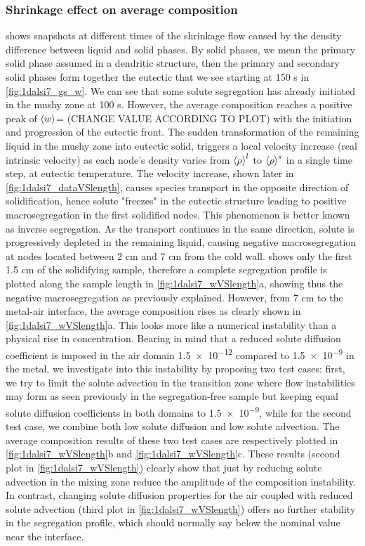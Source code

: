 \subsubsection{Shrinkage effect on average composition}
 shows snapshots at different times of the shrinkage flow caused by the density difference between liquid and solid phases.
By solid phases, we mean the primary solid phase assumed in a dendritic structure, then the primary and secondary solid phases form together the eutectic
that we see starting at 150 s in \cref{fig:1dalsi7_gs_w}. We can see that some solute segregation has already initiated in the mushy zone at 100 s.
However, the average composition reaches a positive peak of $\left \langle w \right \rangle$= (CHANGE VALUE ACCORDING TO PLOT) with the initiation and progression of the eutectic front.
The sudden transformation of the remaining liquid in the mushy zone into eutectic solid, triggers a local velocity increase (real intrinsic velocity)
as each node's density varies from $\left \langle \rho \right \rangle^l$ to $\left \langle \rho \right \rangle^s$ in a single time step, at eutectic temperature. The velocity increase, shown later in \cref{fig:1dalsi7_dataVSlength},
causes species transport in the opposite direction of solidification, hence solute "freezes" in the eutectic structure leading to positive macrosegregation
in the first solidified nodes. This phenomenon is better known as inverse segregation. 
As the transport continues in the same direction, 
solute is progressively depleted in the remaining liquid, causing negative macrosegregation at nodes located between 2 cm and 7 cm from the cold wall.
 shows only the first 1.5 cm of the solidifying sample, therefore a complete segregation profile is plotted along the sample length in \cref{fig:1dalsi7_wVSlength}a,
showing thus the negative macrosegregation as previously explained.
However, from 7 cm to the metal-air interface, the average composition rises as clearly shown in \cref{fig:1dalsi7_wVSlength}a. This looks more like a numerical
instability than a physical rise in concentration. 
Bearing in mind that a reduced solute diffusion coefficient is imposed in the air domain \SI{1.5e-12}{\udiffusivity} compared to 
\SI{1.5e-9}{\udiffusivity} in the metal, we investigate into this instability by proposing two test cases: first, we try to limit the solute advection in the transition
zone where flow instabilities may form as seen previously in the segregation-free sample but keeping equal solute diffusion coefficients in both domains to \SI{1.5e-9}{\udiffusivity},
while for the second test case, we combine both low solute diffusion and low solute advection. The average composition results of these two test cases
are respectively plotted in \cref{fig:1dalsi7_wVSlength}b and \cref{fig:1dalsi7_wVSlength}c.
These results (second plot in \cref{fig:1dalsi7_wVSlength})  clearly show that just by reducing solute advection in the mixing zone reduce the amplitude of the composition instability.
In contrast, changing solute diffusion properties for the air coupled with reduced solute advection (third plot in \cref{fig:1dalsi7_wVSlength}) offers no further stability
in the segregation profile, which should normally say below the nominal value near the interface.

